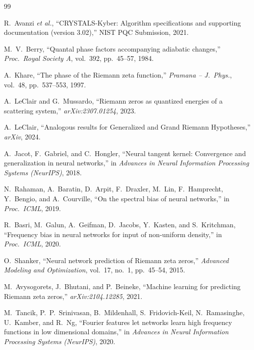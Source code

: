 \documentclass[11pt, a4paper]{article}
\theoremstyle{definition}
\theoremstyle{plain}
\begin{document}
\begin{thebibliography}{99}

R.~Avanzi \textit{et al.},
``CRYSTALS-Kyber: Algorithm specifications and supporting documentation
(version 3.02),'' NIST PQC Submission, 2021.

M.~V.~Berry,
``Quantal phase factors accompanying adiabatic changes,''
\textit{Proc.\ Royal Society A}, vol.~392, pp.~45--57, 1984.

A.~Khare,
``The phase of the Riemann zeta function,''
\textit{Pramana -- J.\ Phys.}, vol.~48, pp.~537--553, 1997.

A.~LeClair and G.~Mussardo,
``Riemann zeros as quantized energies of a scattering system,''
\textit{arXiv:2307.01254}, 2023.

A.~LeClair,
``Analogous results for Generalized and Grand Riemann Hypotheses,''
\textit{arXiv}, 2024.

A.~Jacot, F.~Gabriel, and C.~Hongler,
``Neural tangent kernel: Convergence and generalization in neural networks,''
in \textit{Advances in Neural Information Processing Systems (NeurIPS)}, 2018.

N.~Rahaman, A.~Baratin, D.~Arpit, F.~Draxler, M.~Lin, F.~Hamprecht,
Y.~Bengio, and A.~Courville,
``On the spectral bias of neural networks,''
in \textit{Proc.\ ICML}, 2019.

R.~Basri, M.~Galun, A.~Geifman, D.~Jacobs, Y.~Kasten, and S.~Kritchman,
``Frequency bias in neural networks for input of non-uniform density,''
in \textit{Proc.\ ICML}, 2020.

O.~Shanker,
``Neural network prediction of Riemann zeta zeros,''
\textit{Advanced Modeling and Optimization}, vol.~17, no.~1, pp.~45--54,
2015.

M.~Avysogorets, J.~Bhutani, and P.~Beineke,
``Machine learning for predicting Riemann zeta zeros,''
\textit{arXiv:2104.12285}, 2021.

M.~Tancik, P.~P.~Srinivasan, B.~Mildenhall, S.~Fridovich-Keil,
N.~Ramasinghe, U.~Kamber, and R.~Ng,
``Fourier features let networks learn high frequency functions in low
dimensional domains,''
in \textit{Advances in Neural Information Processing Systems (NeurIPS)},
2020.


\end{thebibliography}
\end{document}
